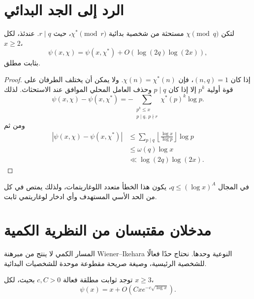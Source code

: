 \section{الرد إلى الجد البدائي}

\begin{lemma}
\label{lem:chapter12-primitive-psi-reduction}
\provedhere
لتكن \(\chi\pmod q\) مستحثة من شخصية بدائية \(\chi^*\pmod r\)، حيث
\(r\mid q\). عندئذ، لكل \(x\ge2\)،
\[
\psi(x,\chi)
=
\psi(x,\chi^*)+O(\log(2q)\log(2x)),
\]
بثابت مطلق.
\end{lemma}

\begin{proof}
إذا كان \((n,q)=1\)، فإن \(\chi(n)=\chi^*(n)\). ولا يمكن أن يختلف الطرفان
على قوة أولية \(p^k\) إلا إذا كان \(p\mid q\) وحذف العامل المحلي الموافق
عند الاستحثاث. لذلك
\[
\psi(x,\chi)-\psi(x,\chi^*)
=
-\sum_{\substack{p^k\le x\\p\mid q,\ p\nmid r}}
\chi^*(p)^k\log p.
\]
ومن ثم
\begin{align*}
\left|\psi(x,\chi)-\psi(x,\chi^*)\right|
&\le
\sum_{p\mid q}\left\lfloor\frac{\log x}{\log p}\right\rfloor\log p\\
&\le \omega(q)\log x\\
&\ll \log(2q)\log(2x).
\end{align*}
\end{proof}

في المجال \(q\le(\log x)^A\)، يكون هذا الخطأ متعدد اللوغاريتمات، ولذلك
يمتص في كل من الحد الأسي المستهدف وأي ادخار لوغاريتمي ثابت.

\section{مدخلان مقتبسان من النظرية الكمية}

المسار الكمي لا ينتج من مبرهنة Wiener--Ikehara النوعية وحدها. نحتاج حدًا
فعالًا للشخصية الرئيسية، وصيغة صريحة مقطوعة موحدة للشخصيات البدائية.

\begin{theorem}
\label{thm:chapter12-effective-pnt}
توجد ثوابت مطلقة فعالة \(c,C>0\) بحيث، لكل \(x\ge3\)،
\[
\psi(x)=x+O\!\left(Cxe^{-c\sqrt{\log x}}\right).
\tag{12.2}
\]
\end{theorem}

